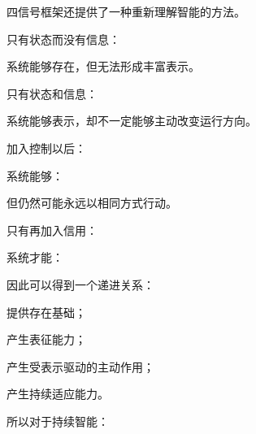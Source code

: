 四信号框架还提供了一种重新理解智能的方法。

只有状态而没有信息：

系统能够存在，但无法形成丰富表示。

只有状态和信息：

系统能够表示，却不一定能够主动改变运行方向。

加入控制以后：

系统能够：

\begin{statementbox}
\centering
{}
\end{statementbox}

但仍然可能永远以相同方式行动。

只有再加入信用：

系统才能：

\begin{statementbox}
\centering
{}
\end{statementbox}

因此可以得到一个递进关系：

\begin{statementbox}
\centering
{}
\end{statementbox}

提供存在基础；

\begin{statementbox}
\centering
{}
\end{statementbox}

产生表征能力；

\begin{statementbox}
\centering
{}
\end{statementbox}

产生受表示驱动的主动作用；

\begin{statementbox}
\centering
{}
\end{statementbox}

产生持续适应能力。

所以对于持续智能：

\begin{statementbox}
\centering
{}
\end{statementbox}

